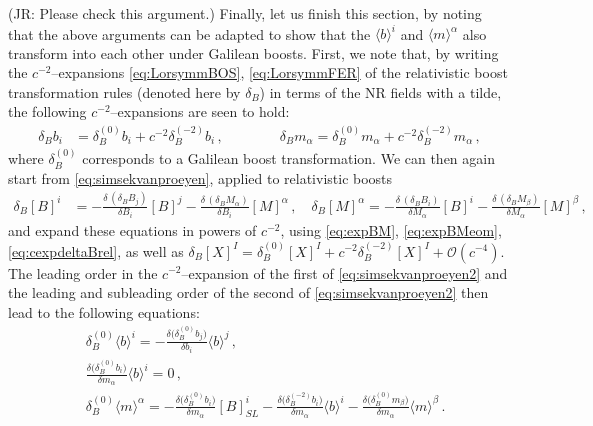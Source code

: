 \documentclass[a4paper,10pt,openany]{article}
\newcommand{\JR}[1]{\textcolor{darkergreen}{#1}}
\begin{document}
	\JR{(JR: Please check this argument.)} Finally, let us finish this section, by noting that the above arguments can be adapted to show that the $\langle b \rangle^i$ and $\langle m \rangle^\alpha$ also transform into each other under Galilean boosts. First, we note that, by writing the $c^{-2}$--expansions \eqref{eq:LorsymmBOS}, \eqref{eq:LorsymmFER} of the relativistic boost transformation rules (denoted here by $\delta_B$) in terms of the NR fields with a tilde, the following $c^{-2}$--expansions are seen to hold:
	\begin{align}
		\label{eq:cexpdeltaBrel}
		\delta_B b_i &= \delta^{(0)}_B b_i + c^{-2} \delta^{(-2)}_B b_i \,, \qquad \qquad
		\delta_B m_\alpha = \delta^{(0)}_B m_\alpha + c^{-2} \delta^{(-2)}_B m_\alpha \,,
	\end{align}
	where $\delta^{(0)}_B$ corresponds to a Galilean boost transformation. We can then again start from \eqref{eq:simsekvanproeyen}, applied to relativistic boosts
	\begin{align} \label{eq:simsekvanproeyen2}
		\delta_B [B]^i &= - \frac{\delta\,(\delta_B B_j)}{\delta B_i} [B]^j - \frac{\delta\,(\delta_B M_\alpha)}{\delta B_i} [M]^\alpha \,, \quad
		\delta_B [M]^\alpha =  - \frac{\delta\,(\delta_B B_i)}{\delta M_\alpha} [B]^i - \frac{\delta\,(\delta_B M_\beta)}{\delta M_\alpha} [M]^\beta \,,
	\end{align}
	and expand these equations in powers of $c^{-2}$, using \eqref{eq:expBM}, \eqref{eq:expBMeom}, \eqref{eq:cexpdeltaBrel}, as well as $\delta_B [X]^I = \delta_B^{(0)} [X]^I + c^{-2} \delta_B^{(-2)} [X]^I + \mathcal{O}(c^{-4})$. The leading order in the $c^{-2}$--expansion of the first of \eqref{eq:simsekvanproeyen2} and the leading and subleading order of the second of \eqref{eq:simsekvanproeyen2} then lead to the following equations:
	\begin{subequations} \label{eq:deltaBbm}
		\begin{align}
			& \delta_B^{(0)} \langle b \rangle^i = - \frac{\delta \big(\delta_B^{(0)} b_j\big)}{\delta b_i} \langle b \rangle^j \,, \label{eq:deltaBb} \\
			& \frac{\delta \big(\delta_B^{(0)} b_i\big)}{\delta m_\alpha} \langle b \rangle^i = 0 \,, \label{eq:deltaBm1} \\
			& \delta_B^{(0)} \langle m \rangle^\alpha = - \frac{\delta \big( \delta_B^{(0)} b_i\big)}{\delta m_\alpha} [B]_{SL}^i - \frac{\delta \big( \delta_B^{(-2)} b_i\big)}{\delta m_\alpha} \langle b \rangle^i - \frac{\delta \big( \delta_B^{(0)} m_\beta\big)}{\delta m_\alpha} \langle m \rangle^\beta \,. \label{eq:deltaBm2}
		\end{align}
	\end{subequations}
\end{document}
